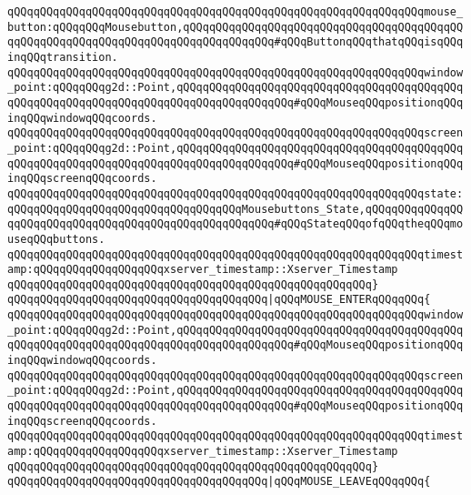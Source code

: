 \verb|qQQqqQQqqQQqqQQqqQQqqQQqqQQqqQQqqQQqqQQqqQQqqQQqqQQqqQQqqQQqqQQqmouse_button:qQQqqQQqMousebutton,qQQqqQQqqQQqqQQqqQQqqQQqqQQqqQQqqQQqqQQqqQQqqQQqqQQqqQQqqQQqqQQqqQQqqQQqqQQqqQQqqQQq#qQQqButtonqQQqthatqQQqisqQQqinqQQqtransition.|\newline
\verb|qQQqqQQqqQQqqQQqqQQqqQQqqQQqqQQqqQQqqQQqqQQqqQQqqQQqqQQqqQQqqQQqwindow_point:qQQqqQQqg2d::Point,qQQqqQQqqQQqqQQqqQQqqQQqqQQqqQQqqQQqqQQqqQQqqQQqqQQqqQQqqQQqqQQqqQQqqQQqqQQqqQQqqQQqqQQq#qQQqMouseqQQqpositionqQQqinqQQqwindowqQQqcoords.|\newline
\verb|qQQqqQQqqQQqqQQqqQQqqQQqqQQqqQQqqQQqqQQqqQQqqQQqqQQqqQQqqQQqqQQqscreen_point:qQQqqQQqg2d::Point,qQQqqQQqqQQqqQQqqQQqqQQqqQQqqQQqqQQqqQQqqQQqqQQqqQQqqQQqqQQqqQQqqQQqqQQqqQQqqQQqqQQqqQQq#qQQqMouseqQQqpositionqQQqinqQQqscreenqQQqcoords.|\newline
\verb|qQQqqQQqqQQqqQQqqQQqqQQqqQQqqQQqqQQqqQQqqQQqqQQqqQQqqQQqqQQqqQQqstate:qQQqqQQqqQQqqQQqqQQqqQQqqQQqqQQqqQQqMousebuttons_State,qQQqqQQqqQQqqQQqqQQqqQQqqQQqqQQqqQQqqQQqqQQqqQQqqQQqqQQq#qQQqStateqQQqofqQQqtheqQQqmouseqQQqbuttons.|\newline
\verb|qQQqqQQqqQQqqQQqqQQqqQQqqQQqqQQqqQQqqQQqqQQqqQQqqQQqqQQqqQQqqQQqtimestamp:qQQqqQQqqQQqqQQqqQQqxserver_timestamp::Xserver_Timestamp|\newline
\verb|qQQqqQQqqQQqqQQqqQQqqQQqqQQqqQQqqQQqqQQqqQQqqQQqqQQqqQQq}|\newline
\newline
\verb|qQQqqQQqqQQqqQQqqQQqqQQqqQQqqQQqqQQqqQQq|\verb#|qQQqMOUSE_ENTERqQQqqQQq{#\newline
\verb|qQQqqQQqqQQqqQQqqQQqqQQqqQQqqQQqqQQqqQQqqQQqqQQqqQQqqQQqqQQqqQQqwindow_point:qQQqqQQqg2d::Point,qQQqqQQqqQQqqQQqqQQqqQQqqQQqqQQqqQQqqQQqqQQqqQQqqQQqqQQqqQQqqQQqqQQqqQQqqQQqqQQqqQQqqQQq#qQQqMouseqQQqpositionqQQqinqQQqwindowqQQqcoords.|\newline
\verb|qQQqqQQqqQQqqQQqqQQqqQQqqQQqqQQqqQQqqQQqqQQqqQQqqQQqqQQqqQQqqQQqscreen_point:qQQqqQQqg2d::Point,qQQqqQQqqQQqqQQqqQQqqQQqqQQqqQQqqQQqqQQqqQQqqQQqqQQqqQQqqQQqqQQqqQQqqQQqqQQqqQQqqQQqqQQq#qQQqMouseqQQqpositionqQQqinqQQqscreenqQQqcoords.|\newline
\verb|qQQqqQQqqQQqqQQqqQQqqQQqqQQqqQQqqQQqqQQqqQQqqQQqqQQqqQQqqQQqqQQqtimestamp:qQQqqQQqqQQqqQQqqQQqxserver_timestamp::Xserver_Timestamp|\newline
\verb|qQQqqQQqqQQqqQQqqQQqqQQqqQQqqQQqqQQqqQQqqQQqqQQqqQQqqQQq}|\newline
\newline
\verb|qQQqqQQqqQQqqQQqqQQqqQQqqQQqqQQqqQQqqQQq|\verb#|qQQqMOUSE_LEAVEqQQqqQQq{#\newline
